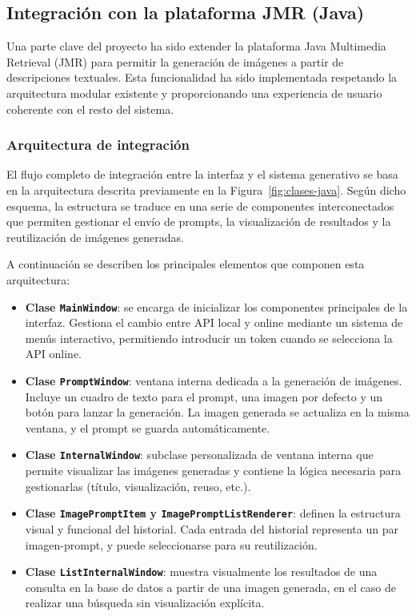 \subsection{Integración con la plataforma JMR (Java)}

Una parte clave del proyecto ha sido extender la plataforma Java Multimedia Retrieval (JMR) para permitir la generación de imágenes a partir de descripciones textuales. Esta funcionalidad ha sido implementada respetando la arquitectura modular existente y proporcionando una experiencia de usuario coherente con el resto del sistema.

\subsubsection{Arquitectura de integración}

El flujo completo de integración entre la interfaz y el sistema generativo se basa en la arquitectura descrita previamente en la Figura~\ref{fig:clases-java}. Según dicho esquema, la estructura se traduce en una serie de componentes interconectados que permiten gestionar el envío de prompts, la visualización de resultados y la reutilización de imágenes generadas.

A continuación se describen los principales elementos que componen esta arquitectura:

\begin{itemize}
    \item \textbf{Clase \texttt{MainWindow}}: se encarga de inicializar los componentes principales de la interfaz. Gestiona el cambio entre API local y online mediante un sistema de menús interactivo, permitiendo introducir un token cuando se selecciona la API online.
    
    \item \textbf{Clase \texttt{PromptWindow}}: ventana interna dedicada a la generación de imágenes. Incluye un cuadro de texto para el prompt, una imagen por defecto y un botón para lanzar la generación. La imagen generada se actualiza en la misma ventana, y el prompt se guarda automáticamente.

    \item \textbf{Clase \texttt{InternalWindow}}: subclase personalizada de ventana interna que permite visualizar las imágenes generadas y contiene la lógica necesaria para gestionarlas (título, visualización, reuso, etc.).

    \item \textbf{Clase \texttt{ImagePromptItem} y \texttt{ImagePromptListRenderer}}: definen la estructura visual y funcional del historial. Cada entrada del historial representa un par imagen-prompt, y puede seleccionarse para su reutilización.

    \item \textbf{Clase \texttt{ListInternalWindow}}: muestra visualmente los resultados de una consulta en la base de datos a partir de una imagen generada, en el caso de realizar una búsqueda sin visualización explícita.
\end{itemize}

